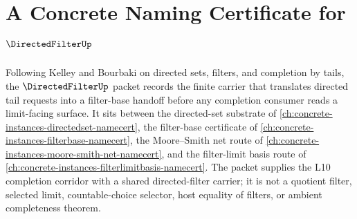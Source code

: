 \chapter{A Concrete Naming Certificate for $\DirectedFilterUp$}
\label{ch:concrete-instances-directed-filter-namecert}

Following Kelley and Bourbaki on directed sets, filters, and completion by tails, the $\DirectedFilterUp$ packet records the finite carrier that translates directed tail requests into a filter-base handoff before any completion consumer reads a limit-facing surface. It sits between the directed-set substrate of \autoref{ch:concrete-instances-directedset-namecert}, the filter-base certificate of \autoref{ch:concrete-instances-filterbase-namecert}, the Moore--Smith net route of \autoref{ch:concrete-instances-moore-smith-net-namecert}, and the filter-limit basis route of \autoref{ch:concrete-instances-filterlimitbasis-namecert}. The packet supplies the L10 completion corridor with a shared directed-filter carrier; it is not a quotient filter, selected limit, countable-choice selector, host equality of filters, or ambient completeness theorem.

